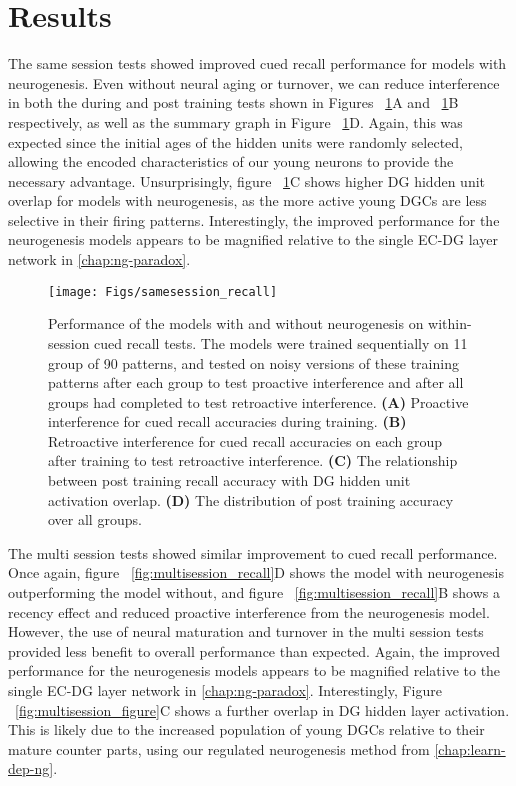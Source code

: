 \section{Results}

The same session tests showed improved cued recall performance 
for models with neurogenesis. 
Even without neural aging or turnover, we can reduce interference in both the 
during and post training tests shown in 
Figures ~\ref{fig:samesession_recall}A and ~\ref{fig:samesession_recall}B 
respectively, as well as the summary graph in Figure ~\ref{fig:samesession_recall}D.
Again, this was expected since the initial ages of the hidden units were randomly selected, 
allowing the encoded characteristics of our young neurons to provide the necessary advantage.
Unsurprisingly, figure ~\ref{fig:samesession_recall}C shows higher 
\ac{DG} hidden unit overlap for models with neurogenesis, as the 
more active young \acp{DGC} are less selective in their firing patterns.
Interestingly, the improved performance for the neurogenesis 
models appears to be magnified relative to the single \ac{EC}-\ac{DG} 
layer network in \cref{chap:ng-paradox}.

\begin{figure}[!hp]
\begin{center}
\texttt{[image: Figs/samesession\_recall]}
\end{center}
\caption{Performance of the models 
with and without neurogenesis on within-session cued recall tests. 
The models were trained sequentially on 11 group of 90 patterns, 
and tested on noisy versions of these training patterns 
after each group to test proactive interference and after all groups had completed to test retroactive interference. 
\textbf{(A)} Proactive interference for cued recall accuracies during training. 
\textbf{(B)} Retroactive interference for cued recall accuracies on each 
group after training to test retroactive interference. 
\textbf{(C)} The relationship between post training recall accuracy with 
\ac{DG} hidden unit activation overlap. 
\textbf{(D)} The distribution of post training accuracy over all groups.
}
\label{fig:samesession_recall}
\end{figure}

The multi session tests showed similar improvement to cued recall performance. 
Once again, figure ~\ref{fig:multisession_recall}D shows the model with 
neurogenesis outperforming the model without, and 
figure ~\ref{fig:multisession_recall}B shows a 
recency effect and reduced proactive interference from the neurogenesis model. 
However, the use of neural maturation and turnover in the multi session 
tests provided less benefit to overall performance than expected. 
Again, the improved performance for the neurogenesis 
models appears to be magnified relative to the single \ac{EC}-\ac{DG} 
layer network in \cref{chap:ng-paradox}.
Interestingly, Figure ~\ref{fig:multisession_figure}C shows a further overlap in 
\ac{DG} hidden layer activation.
This is likely due to the increased population of young \acp{DGC} relative to their 
mature counter parts, using our regulated neurogenesis method from 
\cref{chap:learn-dep-ng}.

